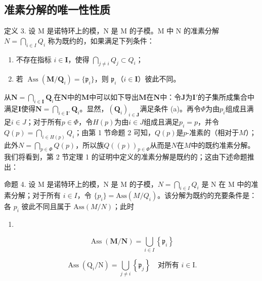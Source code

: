 \subsection{准素分解的唯一性性质}

定义 3. 设 M 是诺特环上的模，N 是 M 的子模。M 中 N 的准素分解 \(N = \bigcap_{i \in I} Q_i\) 称为既约的，如果满足下列条件：

\begin{enumerate}
\def\labelenumi{(\alph{enumi})}
\item
  不存在指标 \(i \in \mathbf{I}\)，使得 \(\bigcap_{j \neq i} Q_j \subset Q_i\)；
\item
  若 \(\operatorname{Ass}(\mathbf{M} / \mathbf{Q}_i) = \{\mathfrak{p}_i\}\)，则 \(\mathfrak{p}_i\)（\(i \in \mathbf{I}\)）彼此不同。
\end{enumerate}

从\(\mathbf{N} = \bigcap_{i\in \mathbf{I}}\mathbf{Q}_i\)在\(\mathbf{N}\)中的\(\mathbf{M}\)中可以如下导出\(\mathbf{M}\)在\(\mathbf{N}\)中：令\(\mathbf{J}\)为\(\mathbf{I}'\)的子集所成集合中满足\(\mathbf{I}\)使得\(\mathbf{N} = \bigcap_{i\in \mathbf{I}'}\mathbf{Q}_i\)。显然，\((\mathbf{Q}_i)_{i\in \mathbf{J}}\)满足条件 (a)。再令\(\Phi\)为由\(p_i\)组成且满足\(i\in J\)；对于所有\(p\in \Phi\)，令\(H(p)\)为由\(i\in J\)组成且满足\(p_i = p\)，并令\(Q(p) = \bigcap_{i\in H(p)}Q_i\)；由第 1 节命题 2 可知，\(Q(p)\)是\(p\)-准素的（相对于\(M\)）；此外\(N = \bigcap_{p\in \Phi}Q(p)\)，所以族\(Q((p))_{p\in \Phi}\)从而是\(N\)在\(M\)中的既约准素分解。我们将看到，第 2 节定理 1 的证明中定义的准素分解是既约的；这由下述命题推出：

命题 4. 设 M 是诺特环上的模，N 是 M 的子模，\(N = \bigcap_{i \in I} Q_i\) 是 N 在 M 中的准素分解；对于所有 \(i \in I\)，令 \(\{p_i\} = \text{Ass}(M/Q_i)\)。该分解为既约的充要条件是：各 \(p_i\) 彼此不同且属于 \(\text{Ass}(M/N)\)；此时

\begin{enumerate}
\def\labelenumi{(\arabic{enumi})}
\setcounter{enumi}{1}
\tightlist
\item
\end{enumerate}

\[
\operatorname{Ass} (\mathbf {M} / \mathbf {N}) = \bigcup_ {i \in I} \left\{\mathfrak {p} _ {i} \right\}\tag{3}
\]

\[
\operatorname{Ass} \left(\mathrm{Q} _ {i} / \mathrm{N}\right) = \bigcup_ {j \neq i} \left\{\mathfrak {p} _ {j} \right\} \quad \text{对所有 } i \in \mathrm{I}.
\]

